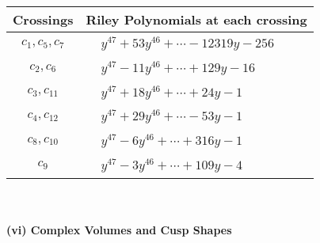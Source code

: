 \documentclass[1p]{elsarticle_modified}
\theoremstyle{definition}
\begin{document}
\begin{tabular}{m{50pt}|m{274pt}}
Crossings & \hspace{64pt}Riley Polynomials at each crossing \\
\hline $$\begin{aligned}c_{1},c_{5},c_{7}\end{aligned}$$&$\begin{aligned}
&y^{47}+53 y^{46}+\cdots-12319 y-256
\end{aligned}$\\
\hline $$\begin{aligned}c_{2},c_{6}\end{aligned}$$&$\begin{aligned}
&y^{47}-11 y^{46}+\cdots+129 y-16
\end{aligned}$\\
\hline $$\begin{aligned}c_{3},c_{11}\end{aligned}$$&$\begin{aligned}
&y^{47}+18 y^{46}+\cdots+24 y-1
\end{aligned}$\\
\hline $$\begin{aligned}c_{4},c_{12}\end{aligned}$$&$\begin{aligned}
&y^{47}+29 y^{46}+\cdots-53 y-1
\end{aligned}$\\
\hline $$\begin{aligned}c_{8},c_{10}\end{aligned}$$&$\begin{aligned}
&y^{47}-6 y^{46}+\cdots+316 y-1
\end{aligned}$\\
\hline $$\begin{aligned}c_{9}\end{aligned}$$&$\begin{aligned}
&y^{47}-3 y^{46}+\cdots+109 y-4
\end{aligned}$\\
\hline
\end{tabular}\\~\\
\newpage\flushleft \textbf{(vi) Complex Volumes and Cusp Shapes}
\end{document}
